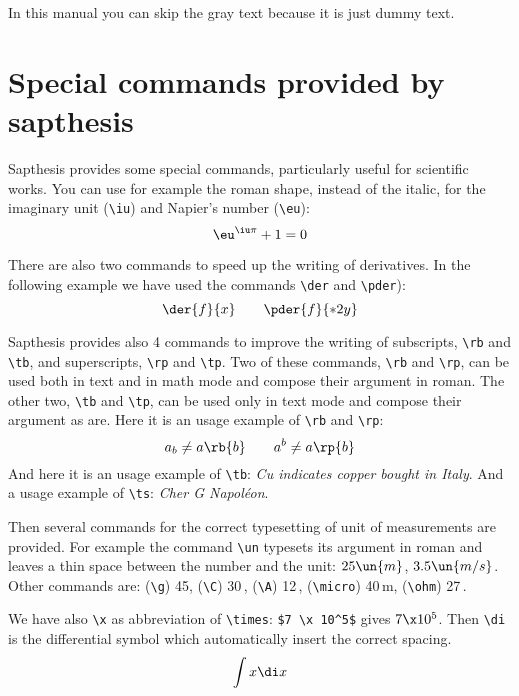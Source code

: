 \documentclass[LaM,binding=0.6cm]{sapthesis}
\newcommand{\bs}{\textbackslash}
\begin{document}
In this manual you can skip the gray text because it is just dummy text.

\textcolor{gray}{\lipsum}


\appendix
\chapter{Special commands provided by \textsf{sapthesis}}

\textsf{Sapthesis} provides some special commands, particularly useful for scientific works. You can use for example the roman shape, instead of the italic, for the imaginary unit (\texttt{\bs iu}) and Napier's number (\texttt{\bs eu}):
\begin{equation}
\eu^{\iu\pi}+1=0
\end{equation}

There are also two commands to speed up the writing of derivatives. In the following example we have used the commands \texttt{\bs der} and \texttt{\bs pder}):
\begin{equation}
\der{f}{x} \qquad \pder{f}{*{2}{y}}
\end{equation}


\textsf{Sapthesis} provides also 4 commands to improve the writing of subscripts, \texttt{\bs rb} and \texttt{\bs tb}, and superscripts, \texttt{\bs rp} and \texttt{\bs tp}. Two of these commands, \texttt{\bs rb} and \texttt{\bs rp}, can be used both in text and in math mode and compose their argument in roman. The other two, \texttt{\bs tb} and \texttt{\bs tp}, can be used only in text mode and compose their argument as are. Here it is an usage example of \texttt{\bs rb} and \texttt{\bs rp}:
\[
a_b \neq a\rb{b}\qquad a^b \neq a\rp{b}
\]
And here it is an usage example of \texttt{\bs tb}: \emph{Cu indicates copper bought in Italy}. And a usage example of \texttt{\bs ts}: \emph{Cher G Napol\'eon}.


Then several commands for the correct typesetting of unit of measurements are provided. For example the command \texttt{\bs un} typesets its argument in roman and leaves a thin space between the number and the unit: $25\un{m}$, $3.5\un{m/s}$. Other commands are: (\texttt{\bs g}) 45\g, (\texttt{\bs C}) 30\,\C, (\texttt{\bs A}) 12\,\A, (\texttt{\bs micro}) 40\,\micro m, (\texttt{\bs ohm}) 27\,\ohm. 

We have also \texttt{\bs x} as abbreviation of \texttt{\bs times}: \texttt{\$7 \bs x 10\^{}5\$} gives $7 \x 10^5$. Then \texttt{\bs di} is the differential symbol which automatically insert the correct spacing.
\[
\int x \di x
\]
\end{document}
